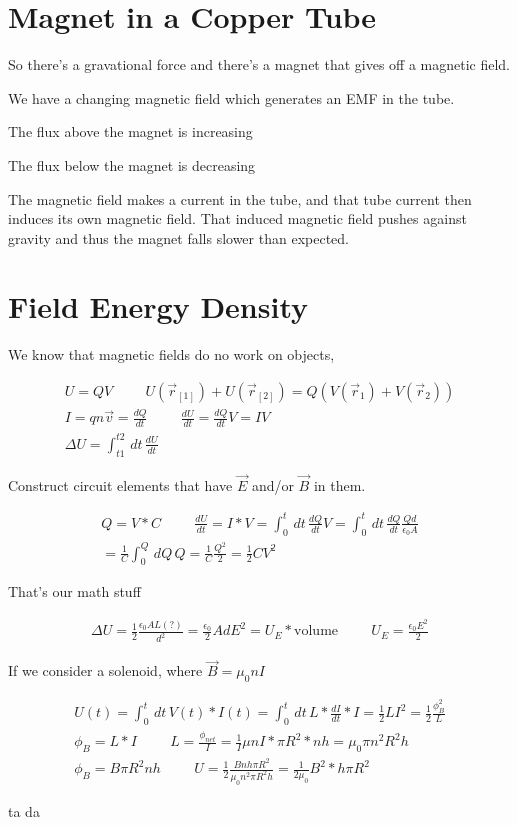 \documentclass[fleqn]{report}
\newcommand{\hp}{\hspace{1cm}}
\newcommand{\equations} [1] {
\begin{gather*}
#1
\end{gather*}
}
\begin{document}
\section{Magnet in a Copper Tube}
So there's a gravational force and there's a magnet that gives off a magnetic 
field. 

We have a changing magnetic field which generates an EMF in the tube. 

The flux above the magnet is increasing

The flux below the magnet is decreasing

The magnetic field makes a current in the tube, and that tube current then 
induces its own magnetic field. That induced magnetic field pushes 
against gravity and thus the magnet falls slower than expected. 

\section{Field Energy Density}
We know that magnetic fields do no work on objects,
\equations{
    U = QV 
    \hp 
    U(\vec r_[1])
    +
    U(\vec r_[2])
    =
    Q \left(
        V(\vec r_1) + V(\vec r_2)
    \right)
    \\
    I = qn \vec v 
    =
    \frac{dQ}{dt}
    \hp 
    \frac{dU}{dt} 
    =
    \frac{dQ}{dt}
    V 
    =
    I V
    \\
    \Delta U 
    =
    \int^{t2}_{t1} \, dt \, 
    \frac{dU}{dt} 
}

Construct circuit elements that have $\vec E$ and/or $\vec B$ in them. 

\equations{
    Q = V * C 
    \hp 
    \frac{dU}{dt}
    =
    I * V 
    =
    \int^{t}_{0} \, dt \, 
    \frac{dQ}{dt} V 
    =
    \int^{t}_{0} \, dt \, 
    \frac{dQ}{dt} 
    \frac{Qd}{\epsilon_0 A}
    \\
    =
    \frac{1}{C}
    \int^{Q}_{0} \, dQ \, 
    Q 
    =
    \frac{1}{C}
    \frac{Q^2}{2}
    =
    \frac{1}{2} CV^2
}

That's our math stuff 
\equations{
    \Delta U 
    =
    \frac{1}{2}
    \frac{\epsilon_0 A L(?)}{d^2}
    =
    \frac{\epsilon_0}{2}
    A d E^2 
    =
    U_{E}
    *
    \textrm{volume}
    \hp
    U_{E}
    =
    \frac{\epsilon_0 E^2}{2}
}

If we consider a solenoid, where $\vec B = \mu_0 n I$ 

\equations{
    U(t)
    =
    \int^{t}_{0} \, dt \, 
    V(t) * I(t) 
    =
    \int^{t}_{0} \, dt \, 
    L * \frac{dI}{dt} * I 
    =
    \frac{1}{2} L I^2 
    =
    \frac{1}{2} \frac{\phi_{B}^{2}}{L}
    \\
    \phi_{B}
    =
    L * I 
    \hp 
    L 
    =
    \frac{\phi_{net}}{I}
    =
    \frac{1}{I}
    \mu n I * \pi R^2 * nh 
    =
    \mu_0 \pi n^2 R^2 h
    \\
    \phi_{B} 
    =
    B \pi R^2 n h 
    \hp 
    U 
    =
    \frac{1}{2}
    \frac{B n h \pi R^2}{\mu_0 n^2 \pi R^2 h}
    = 
    \frac{1}{2 \mu_0}
    B^2 * h \pi R^2 
}
ta da 
\end{document}
